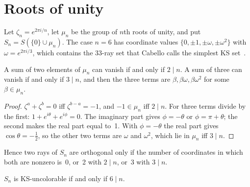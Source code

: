 \section{Roots of unity}\label{sec:roots}

Let $\zeta_n=e^{2\pi i/n}$, let $\mu_n$ be the group of $n$th roots of unity, and put
$S_n=S(\{0\}\cup\mu_n)$.  The case $n=6$ has coordinate values $\{0,\pm1,\pm\omega,\pm\omega^2\}$ with
$\omega=e^{2\pi i/3}$, which contains the 33-ray set that Cabello calls the simplest KS
set~\cite{Cabello2025simplest}.

\begin{lemma}\label{lem:sums}
A sum of two elements of $\mu_n$ can vanish if and only if $2\mid n$.  A sum of three can vanish
if and only if $3\mid n$, and then the three terms are $\beta,\beta\omega,\beta\omega^2$ for some
$\beta\in\mu_n$.
\end{lemma}

\begin{proof}
$\zeta^a+\zeta^b=0$ iff $\zeta^{b-a}=-1$, and $-1\in\mu_n$ iff $2\mid n$.  For three terms divide
by the first: $1+e^{i\theta}+e^{i\phi}=0$.  The imaginary part gives $\phi=-\theta$ or
$\phi=\pi+\theta$; the second makes the real part equal to~1.  With $\phi=-\theta$ the real part
gives $\cos\theta=-\tfrac12$, so the other two terms are $\omega$ and $\omega^2$, which lie in
$\mu_n$ iff $3\mid n$.
\end{proof}

Hence two rays of $S_n$ are orthogonal only if the number of coordinates in which both are
nonzero is~0, or~2 with $2\mid n$, or~3 with $3\mid n$.

\begin{theorem}\label{thm:6n}
$S_n$ is KS-uncolorable if and only if $6\mid n$.
\end{theorem}

